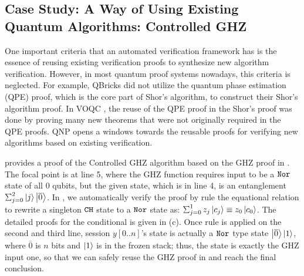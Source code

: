 \subsection{Case Study: A Way of Using Existing Quantum Algorithms: Controlled GHZ}

One important criteria that an automated verification framework has is the essence of reusing existing verification proofs to synthesize new algorithm verification. However, in most quantum proof systems nowadays, this criteria is neglected. For example, QBricks did not utilize the quantum phase estimation (QPE) proof, which is the core part of Shor's algorithm, to construct their Shor's algorithm proof.
In VOQC \cite{VOQC}, the reuse of the QPE proof in the Shor's proof was done by proving many new theorems that were not originally required in the QPE proofs. QNP opens a windows towards the reusable proofs for verifying new algorithms based on existing verification.

 provides a proof of the Controlled GHZ algorithm based on the GHZ proof in . The focal point is at  line 5, where the GHZ function requires input to be a $\texttt{Nor}$ state of all $0$ qubits, but the given state, which is in line 4, is an entanglement $\scha{2}{}{j}{\ket{\overline{0}}}$. In \qafny, we automatically verify the proof by rule  the equational relation to rewrite a singleton $\texttt{CH}$ state to a $\texttt{Nor}$ state as: $\sch{1}{z_j}{c_j}\equiv z_0\ket{c_0}$. The detailed proofs for the conditional is given in (c). Once rule  is applied on the second and third line, session $y[0..n]$'s state is actually a $\texttt{Nor}$ type state ${\left\vert{\overline{0}}\right\rangle}\left\vert{1}\right\rangle$, where $\overline{0}$ is $n$ bits and $\left\vert{1}\right\rangle$ is in the frozen stack; thus, the state is exactly the GHZ input one, so that we can safely reuse the GHZ proof in  and reach the final conclusion. 






